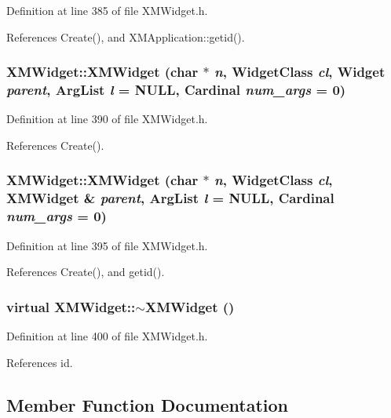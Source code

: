 Definition at line 385 of file XMWidget.h.

References Create(), and XMApplication::getid().
\subsubsection{\setlength{\rightskip}{0pt plus 5cm}XMWidget::XMWidget (char $\ast$ {\em n}, Widget\-Class {\em cl}, Widget {\em parent}, Arg\-List {\em l} = NULL, Cardinal {\em num\_\-args} = 0)\hspace{0.3cm}{\tt  [inline]}}\label{classXMWidget_a3}




Definition at line 390 of file XMWidget.h.

References Create().
\subsubsection{\setlength{\rightskip}{0pt plus 5cm}XMWidget::XMWidget (char $\ast$ {\em n}, Widget\-Class {\em cl}, XMWidget \& {\em parent}, Arg\-List {\em l} = NULL, Cardinal {\em num\_\-args} = 0)\hspace{0.3cm}{\tt  [inline]}}\label{classXMWidget_a4}




Definition at line 395 of file XMWidget.h.

References Create(), and getid().
\subsubsection{\setlength{\rightskip}{0pt plus 5cm}virtual XMWidget::$\sim$XMWidget ()\hspace{0.3cm}{\tt  [inline, virtual]}}\label{classXMWidget_a5}




Definition at line 400 of file XMWidget.h.

References id.

\subsection{Member Function Documentation}
